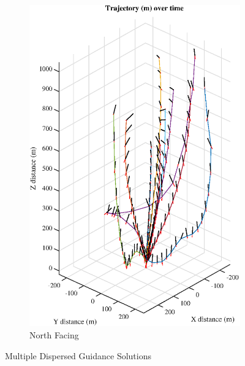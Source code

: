 \begin{figure}[htpb!]
\begin{subfigure}{.5\textwidth}
  \includegraphics[width=1\linewidth]{figs/monte2.eps}
  \caption{North Facing}
  \label{fig:monte2}
\end{subfigure}
\caption{Multiple Dispersed Guidance Solutions}
\label{fig:monte}
\end{figure}

